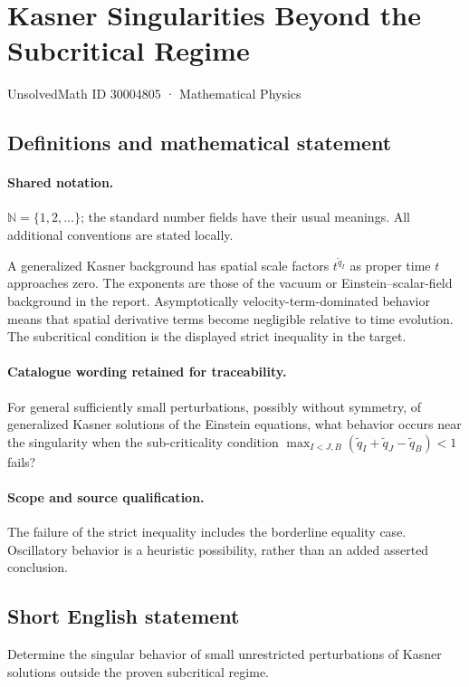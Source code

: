 \documentclass[11pt]{article}
\begin{document}
\setcounter{section}{30004804}
\section{Kasner Singularities Beyond the Subcritical Regime}\label{30004805}
{\small UnsolvedMath ID 30004805 · Mathematical Physics}
\subsection{Definitions and mathematical statement}

\paragraph{Shared notation.}$\mathbb N=\{1,2,\ldots\}$; the standard number fields have their usual meanings. All additional conventions are stated locally.


A generalized Kasner background has spatial scale factors $t^{\widetilde q_I}$ as proper time $t$ approaches zero. The exponents are those of the vacuum or Einstein--scalar-field background in the report. Asymptotically velocity-term-dominated behavior means that spatial derivative terms become negligible relative to time evolution. The subcritical condition is the displayed strict inequality in the target.

\paragraph{Catalogue wording retained for traceability.}
For general sufficiently small perturbations, possibly without symmetry, of generalized Kasner solutions of the Einstein equations, what behavior occurs near the singularity when the sub-criticality condition $\max_{I<J,B}(\widetilde q_I+\widetilde q_J-\widetilde q_B)<1$ fails?

\paragraph{Scope and source qualification.}The failure of the strict inequality includes the borderline equality case. Oscillatory behavior is a heuristic possibility, rather than an added asserted conclusion.
\subsection{Short English statement}
Determine the singular behavior of small unrestricted perturbations of Kasner solutions outside the proven subcritical regime.
\end{document}
